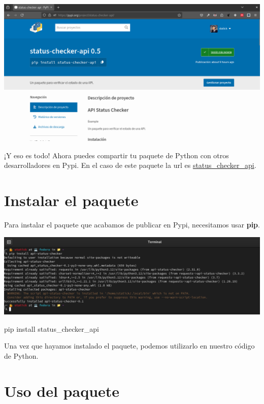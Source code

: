 \documentclass[
  a4paper,
  DIV=11,
  numbers=noendperiod,
  onepage,
  openany]{scrreprt}
\newenvironment{Shaded}{\begin{snugshade}}{\end{snugshade}}
\newcommand{\ExtensionTok}[1]{\textcolor[rgb]{0.00,0.23,0.31}{#1}}
\newcommand{\NormalTok}[1]{\textcolor[rgb]{0.00,0.23,0.31}{#1}}
\begin{document}
\begin{tcolorbox}
\includegraphics{unidades/unidad4/images/paste-10.png}

¡Y eso es todo! Ahora puedes compartir tu paquete de Python con otros
desarrolladores en Pypi. En el caso de este paquete la url es
\href{https://pypi.org/project/status-checker-api/}{status\_checker\_api}.

\chapter{Instalar el paquete}\label{instalar-el-paquete}

Para instalar el paquete que acabamos de publicar en Pypi, necesitamos
usar \textbf{pip}.

\includegraphics{unidades/unidad4/images/paste-4.png}

\begin{Shaded}
\begin{Highlighting}[]
\ExtensionTok{pip}\NormalTok{ install status\_checker\_api}
\end{Highlighting}
\end{Shaded}

Una vez que hayamos instalado el paquete, podemos utilizarlo en nuestro
código de Python.

\chapter{Uso del paquete}\label{uso-del-paquete}


\end{tcolorbox}
\end{document}
